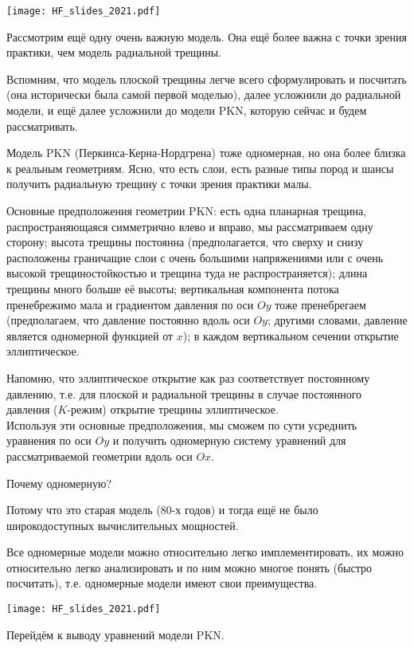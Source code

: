 \documentclass[main.tex]{subfiles}
\begin{document}
\texttt{[image: HF\_slides\_2021.pdf]}

Рассмотрим ещё одну очень важную модель.
Она ещё более важна с точки зрения практики, чем модель радиальной трещины.

Вспомним, что модель плоской трещины легче всего сформулировать и посчитать (она исторически была самой первой моделью), далее усложнили до радиальной модели, и ещё далее усложнили до модели PKN, которую сейчас и будем рассматривать.

Модель PKN (Перкинса-Керна-Нордгрена) тоже одномерная, но она более близка к реальным геометриям.
Ясно, что есть слои, есть разные типы пород и шансы получить радиальную трещину с точки зрения практики малы.

Основные предположения геометрии PKN: есть одна планарная трещина, распространяющаяся симметрично влево и вправо, мы рассматриваем одну сторону;
высота трещины постоянна (предполагается, что сверху и снизу расположены граничащие слои с очень большими напряжениями или с очень высокой трещиностойкостью и трещина туда не распространяется);
длина трещины много больше её высоты;
вертикальная компонента потока пренебрежимо мала и градиентом давления по оси $Oy$ тоже пренебрегаем (предполагаем, что давление постоянно вдоль оси $Oy$;
другими словами, давление является одномерной функцией от $x$);
в каждом вертикальном сечении открытие эллиптическое.

Напомню, что эллиптическое открытие как раз соответствует постоянному давлению, т.е. для плоской и радиальной трещины в случае постоянного давления ($K$-режим) открытие трещины эллиптическое.
\\

Используя эти основные предположения, мы сможем по сути усреднить уравнения по оси $Oy$ и получить одномерную систему уравнений для рассматриваемой геометрии вдоль оси $Ox$.

Почему одномерную?

Потому что это старая модель (80-х годов) и тогда ещё не было широкодоступных вычислительных мощностей.

Все одномерные модели можно относительно легко имплементировать, их можно относительно легко анализировать и по ним можно многое понять (быстро посчитать), т.е. одномерные модели имеют свои преимущества.

\texttt{[image: HF\_slides\_2021.pdf]}

Перейдём к выводу уравнений модели PKN.
\end{document}
